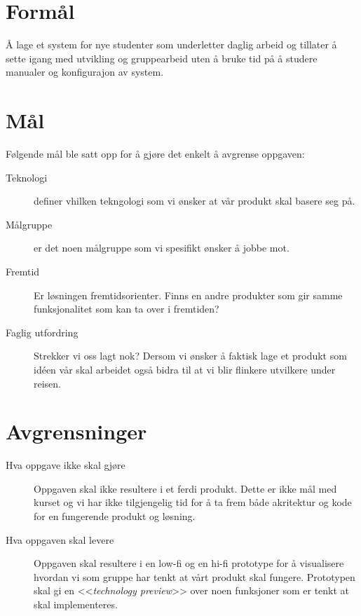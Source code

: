 \section{Formål}
Å lage et system for nye studenter som underletter daglig arbeid og tillater å sette igang med utvikling og gruppearbeid uten å bruke tid på å studere manualer og konfigurajon av system.

\section{Mål}
Følgende mål ble satt opp for å gjøre det enkelt å avgrense oppgaven:
\begin{description}
\item[Teknologi] definer vhilken tekngologi som vi ønsker at vår produkt skal basere seg på.
\item[Målgruppe] er det noen målgruppe som vi spesifikt ønsker å jobbe mot.
\item[Fremtid] Er løsningen fremtidsorienter. Finns en andre produkter som gir samme funksjonalitet som kan ta over i fremtiden?
\item[Faglig utfordring] Strekker vi oss lagt nok? Dersom vi ønsker å faktisk lage et produkt som idéen vår skal arbeidet også bidra til at vi blir flinkere utvilkere under reisen.

\end{description}

\section{Avgrensninger}
\begin{description}
\item[Hva oppgave ikke skal gjøre]
Oppgaven skal ikke resultere i et ferdi produkt. Dette er ikke mål med kurset og vi har ikke tilgjengelig tid for å ta frem både akritektur og kode for en fungerende produkt og løsning.
\item[Hva oppgaven skal levere]
Oppgaven skal resultere i en low-fi og en hi-fi prototype for å visualisere hvordan vi som gruppe har tenkt at vårt produkt skal fungere. Prototypen skal gi en <<\textit{technology preview}>> over noen funksjoner som er tenkt at skal implementeres.
\end{description}

